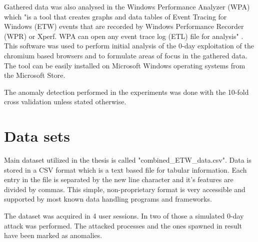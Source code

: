 \documentclass[a4paper,twoside,12pt]{book}
\begin{document}
Gathered data was also analysed in the Windows Performance Analyzer (WPA) which "is a tool that 
creates graphs and data tables of Event Tracing for Windows (ETW) events that are recorded 
by Windows Performance Recorder (WPR) or Xperf. WPA can open any event trace log (ETL) file 
for analysis" \cite{bib:wpa}. This software was used to perform initial analysis of the 0-day 
exploitation of the chromium based browsers and to formulate areas of focus in the gathered data. 
The tool can be easily installed on Microsoft Windows operating systems from the Microsoft Store.

The anomaly detection performed in the experiments was done with the 10-fold cross validation 
unless stated otherwise.

\section{Data sets}

Main dataset utilized in the thesis is called "combined\_ETW\_data.csv".
Data is stored in a CSV format which is a text based file for tabular information.  
Each entry in the file is separated by the new line character and it's features are divided 
by commas. This simple, non-proprietary format is very accessible and supported by most 
known data handling programs and frameworks. 

The dataset was acquired in 4 user sessions. In two of those a simulated 0-day attack was 
performed. The attacked processes and the ones spawned in result have been marked as anomalies. 
\end{document}
